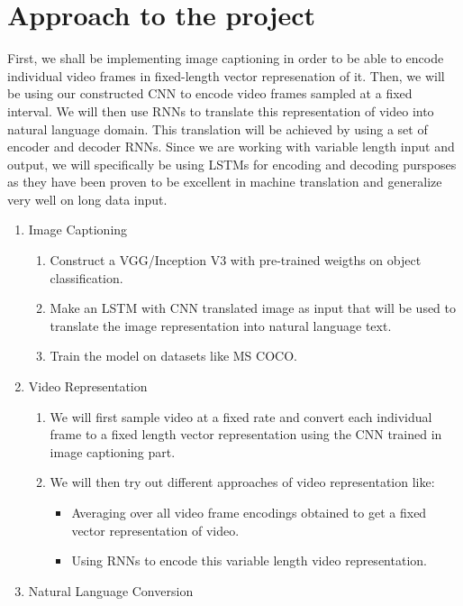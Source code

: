\documentclass{article}
\begin{document}
	\section{Approach to the project}
		First, we shall be implementing image captioning in order to be able to encode individual video frames in fixed-length vector represenation of it.
		Then, we will be using our constructed CNN to encode video frames sampled at a fixed interval.
		We will then use RNNs to translate this representation of video into natural language domain. This translation will be achieved by using a set of encoder and decoder RNNs. Since we are working with variable length input and output, we will specifically be using LSTMs for encoding and decoding pursposes as they have been proven to be excellent in machine translation and generalize very well on long data input.
		\begin{enumerate}
			\item Image Captioning
			\begin{enumerate}
				\item
					Construct a VGG/Inception V3 with pre-trained weigths on object classification.
				\item
					Make an LSTM with CNN translated image as input that will be used to translate the image representation into natural language text.
				\item
					Train the model on datasets like MS COCO.
			\end{enumerate}
			\item Video Representation
			\begin{enumerate}
				\item
					We will first sample video at a fixed rate and convert each individual frame to a fixed length vector representation using the CNN trained in image captioning part.
				\item
					We will then try out different approaches of video representation like:
					\begin{itemize}
						\item
							Averaging over all video frame encodings obtained to get a fixed vector representation of video.
						\item
							Using RNNs to encode this variable length video representation.
					\end{itemize}					
			\end{enumerate}
			\item Natural Language Conversion
			\begin{enumerate}

\end{enumerate}
\end{enumerate}
\end{document}
